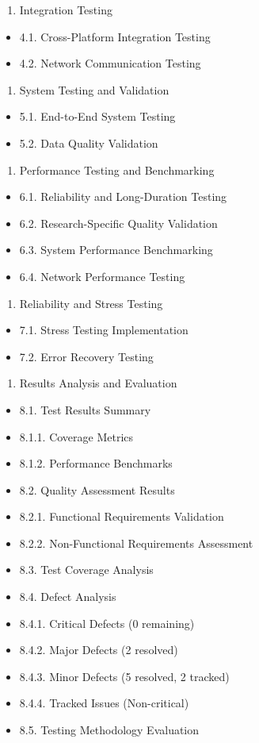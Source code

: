 \documentclass[12pt,a4paper]{article}
\begin{document}
\begin{enumerate}
\item Integration Testing
\end{enumerate}
\begin{itemize}
\item 4.1. Cross-Platform Integration Testing
\item 4.2. Network Communication Testing
\end{itemize}
\begin{enumerate}
\item System Testing and Validation
\end{enumerate}
\begin{itemize}
\item 5.1. End-to-End System Testing
\item 5.2. Data Quality Validation
\end{itemize}
\begin{enumerate}
\item Performance Testing and Benchmarking
\end{enumerate}
\begin{itemize}
\item 6.1. Reliability and Long-Duration Testing
\item 6.2. Research-Specific Quality Validation
\item 6.3. System Performance Benchmarking
\item 6.4. Network Performance Testing
\end{itemize}
\begin{enumerate}
\item Reliability and Stress Testing
\end{enumerate}
\begin{itemize}
\item 7.1. Stress Testing Implementation
\item 7.2. Error Recovery Testing
\end{itemize}
\begin{enumerate}
\item Results Analysis and Evaluation
\end{enumerate}
\begin{itemize}
\item 8.1. Test Results Summary
\item 8.1.1. Coverage Metrics
\item 8.1.2. Performance Benchmarks
\item 8.2. Quality Assessment Results
\item 8.2.1. Functional Requirements Validation
\item 8.2.2. Non-Functional Requirements Assessment
\item 8.3. Test Coverage Analysis
\item 8.4. Defect Analysis
\item 8.4.1. Critical Defects (0 remaining)
\item 8.4.2. Major Defects (2 resolved)
\item 8.4.3. Minor Defects (5 resolved, 2 tracked)
\item 8.4.4. Tracked Issues (Non-critical)
\item 8.5. Testing Methodology Evaluation

\end{itemize}
\end{document}
